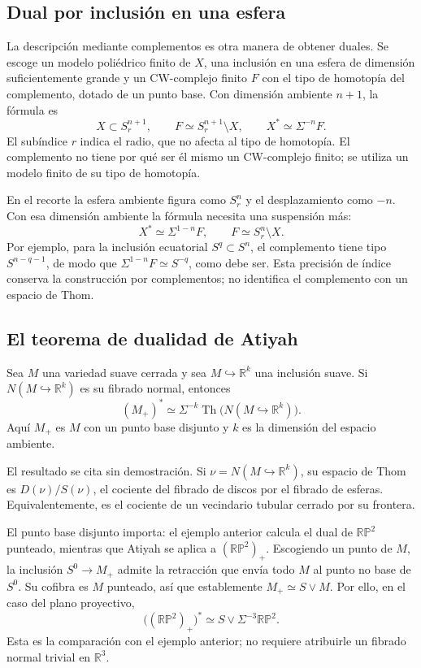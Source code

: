\subsection{Dual por inclusión en una esfera}

La descripción mediante complementos es otra manera de obtener duales. Se escoge un modelo poliédrico finito de $X$, una inclusión en una esfera de dimensión suficientemente grande y un CW-complejo finito $F$ con el tipo de homotopía del complemento, dotado de un punto base. Con dimensión ambiente $n+1$, la fórmula es
\[
X\subset S^{n+1}_r,\qquad F\simeq S^{n+1}_r\setminus X,
\qquad X^*\simeq\Sigma^{-n}F.
\]
El subíndice $r$ indica el radio, que no afecta al tipo de homotopía. El complemento no tiene por qué ser él mismo un CW-complejo finito; se utiliza un modelo finito de su tipo de homotopía.

\begin{nota}
En el recorte la esfera ambiente figura como $S^n_r$ y el desplazamiento como $-n$. Con esa dimensión ambiente la fórmula necesita una suspensión más:
\[
X^*\simeq\Sigma^{1-n}F,\qquad F\simeq S^n_r\setminus X.
\]
Por ejemplo, para la inclusión ecuatorial $S^q\subset S^n$, el complemento tiene tipo $S^{n-q-1}$, de modo que $\Sigma^{1-n}F\simeq S^{-q}$, como debe ser. Esta precisión de índice conserva la construcción por complementos; no identifica el complemento con un espacio de Thom.
\end{nota}

\subsection{El teorema de dualidad de Atiyah}

\begin{teo}\label{teo:atiyah}
Sea $M$ una variedad suave cerrada y sea $M\hookrightarrow\mathbb R^k$ una inclusión suave. Si $N(M\hookrightarrow\mathbb R^k)$ es su fibrado normal, entonces
\[
(M_+)^*\simeq\Sigma^{-k}\operatorname{Th}\bigl(N(M\hookrightarrow\mathbb R^k)\bigr).
\]
Aquí $M_+$ es $M$ con un punto base disjunto y $k$ es la dimensión del espacio ambiente.
\end{teo}

El resultado se cita sin demostración. Si $\nu=N(M\hookrightarrow\mathbb R^k)$, su espacio de Thom es $D(\nu)/S(\nu)$, el cociente del fibrado de discos por el fibrado de esferas. Equivalentemente, es el cociente de un vecindario tubular cerrado por su frontera.

\begin{nota}
El punto base disjunto importa: el ejemplo anterior calcula el dual de $\mathbb{RP}^2$ punteado, mientras que Atiyah se aplica a $(\mathbb{RP}^2)_+$. Escogiendo un punto de $M$, la inclusión $S^0\to M_+$ admite la retracción que envía todo $M$ al punto no base de $S^0$. Su cofibra es $M$ punteado, así que establemente $M_+\simeq S\vee M$. Por ello, en el caso del plano proyectivo,
\[
\bigl((\mathbb{RP}^2)_+\bigr)^*\simeq S\vee\Sigma^{-3}\mathbb{RP}^2.
\]
Esta es la comparación con el ejemplo anterior; no requiere atribuirle un fibrado normal trivial en $\mathbb R^3$.
\end{nota}

